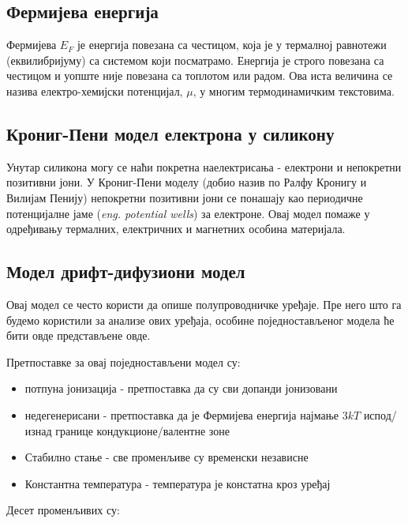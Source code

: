 \documentclass{article}
\begin{document}
\subsection{Фермијева енергија}

Фермијева $E_F$ је енергија повезана са честицом, која је у термалној равнотежи (еквилибријуму) са системом који посматрамо. Енергија је строго повезана са честицом и уопште није повезана са топлотом или радом. Ова иста величина се назива електро-хемијски потенцијал, $\mu$, у многим термодинамичким текстовима.

\subsection{Крониг-Пени модел електрона у силикону}

Унутар силикона могу се наћи покретна наелектрисања - електрони и непокретни позитивни јони. У Крониг-Пени моделу (добио назив по Ралфу Кронигу и Вилијам Пенију) непокретни позитивни јони се понашају као периодичне потенцијалне јаме (\textit{eng. potential wells}) за електроне. Овај модел помаже у одређивању термалних, електричних и магнетних особина материјала.

\subsection{Модел дрифт-дифузиони модел}

Овај модел се често користи да опише полупроводничке уређаје. Пре него што га будемо користили за анализе ових уређаја, особине поједностављеног модела ће бити овде представљене овде.


Претпоставке за овај поједностављени модел су:

 \begin{itemize}
	\item потпуна јонизација - претпоставка да су сви допанди јонизовани
	\item недегенерисани - претпоставка да је Фермијева енергија најмање $3kT$ испод/изнад границе кондукционе/валентне зоне 
	\item Стабилно стање - све променљиве су временски независне
	\item Константна температура - температура је констатна кроз уређај
 \end{itemize}

 Десет променљивих су: 
\end{document}
